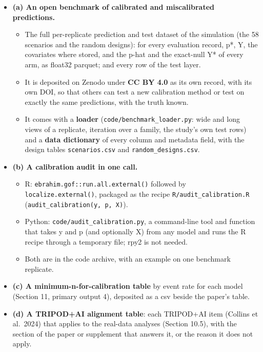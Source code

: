 \documentclass[
  10pt,
]{article}
\providecommand{\tightlist}{%
  \setlength{\itemsep}{0pt}\setlength{\parskip}{0pt}}
\begin{document}
\begin{itemize}
\tightlist
\item
  \textbf{(a) An open benchmark of calibrated and
  miscalibrated predictions.}

  \begin{itemize}
  \tightlist
  \item
    The full per-replicate prediction and test dataset of
    the simulation (the 58 scenarios and the random
    designs): for every evaluation record, p*, Y, the
    covariates where stored, and the p-hat and the
    exact-null Y* of every arm, as float32 parquet; and
    every row of the test layer.
  \item
    It is deposited on Zenodo under \textbf{CC BY 4.0} as
    its own record, with its own DOI, so that others can
    test a new calibration method or test on exactly the
    same predictions, with the truth known.
  \item
    It comes with a \textbf{loader}
    (\texttt{code/benchmark\_loader.py}: wide and long views
    of a replicate, iteration over a family, the study's own
    test rows) and a \textbf{data dictionary} of every
    column and metadata field, with the design tables
    \texttt{scenarios.csv} and \texttt{random\_designs.csv}.
  \end{itemize}
\item
  \textbf{(b) A calibration audit in one call.}

  \begin{itemize}
  \tightlist
  \item
    R: \texttt{ebrahim.gof::run.all.external()} followed by
    \texttt{localize.external()}, packaged as the recipe
    \texttt{R/audit\_calibration.R}
    (\texttt{audit\_calibration(y,\ p,\ X)}).
  \item
    Python: \texttt{code/audit\_calibration.py}, a
    command-line tool and function that takes y and p (and
    optionally X) from any model and runs the R recipe
    through a temporary file; rpy2 is not needed.
  \item
    Both are in the code archive, with an example on one
    benchmark replicate.
  \end{itemize}
\item
  \textbf{(c) A minimum-n-for-calibration table} by event
  rate for each model (Section 11, primary output 4),
  deposited as a csv beside the paper's table.
\item
  \textbf{(d) A TRIPOD+AI alignment table}: each TRIPOD+AI
  item (Collins et al.~2024) that applies to the real-data
  analyses (Section 10.5), with the section of the paper or
  supplement that answers it, or the reason it does not
  apply.
\end{itemize}
\end{document}
